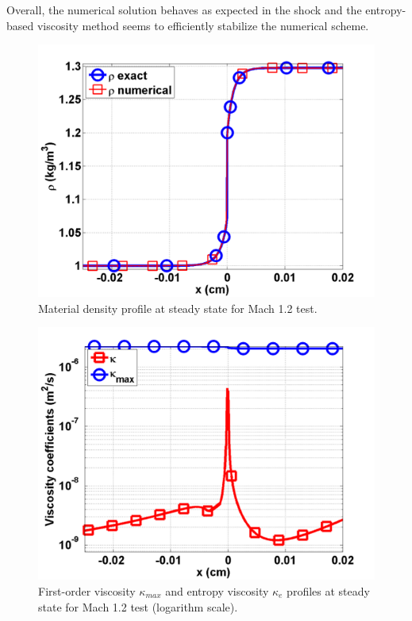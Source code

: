 \documentclass[review]{elsarticle}
\begin{document}
Overall, the numerical solution behaves as expected in the shock and the entropy-based viscosity method seems to efficiently stabilize the numerical scheme.  
\begin{figure}[H]
                \centering
                \includegraphics[width=\textwidth]{Mach_1p2_nel_1000_density.png}
        \caption{Material density profile at steady state for Mach 1.2 test.}\label{fig:Mach12_density}
\end{figure}
\begin{figure}[H]
                \centering
                \includegraphics[width=\textwidth]{Mach_1p2_nel_1000_viscosity.png}
        \caption{First-order viscosity $\kappa_{max}$ and entropy viscosity $\kappa_e$ profiles at steady state for Mach 1.2 test (logarithm scale).}\label{fig:Mach12_viscosity}
\end{figure}
\end{document}
